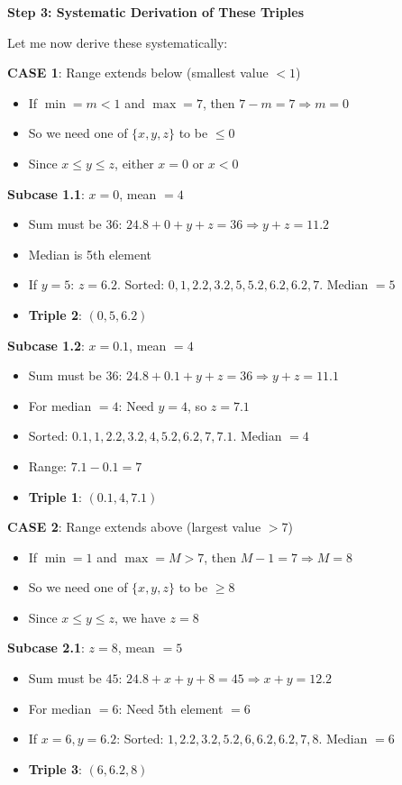 \documentclass[11pt]{article}
\begin{document}
\begin{solutionbox}
\textbf{Step 3: Systematic Derivation of These Triples}

Let me now derive these systematically:

\textbf{CASE 1}: Range extends below (smallest value $< 1$)
\begin{itemize}
    \item If $\min = m < 1$ and $\max = 7$, then $7 - m = 7 \Rightarrow m = 0$
    \item So we need one of $\{x, y, z\}$ to be $\leq 0$
    \item Since $x \leq y \leq z$, either $x = 0$ or $x < 0$
\end{itemize}

\textbf{Subcase 1.1}: $x = 0$, mean $= 4$
\begin{itemize}
    \item Sum must be $36$: $24.8 + 0 + y + z = 36 \Rightarrow y + z = 11.2$
    \item Median is 5th element
    \item If $y = 5$: $z = 6.2$. Sorted: $0, 1, 2.2, 3.2, 5, 5.2, 6.2, 6.2, 7$. Median $= 5$ \checkmark
    \item \textbf{Triple 2}: $(0, 5, 6.2)$ \checkmark
\end{itemize}

\textbf{Subcase 1.2}: $x = 0.1$, mean $= 4$
\begin{itemize}
    \item Sum must be $36$: $24.8 + 0.1 + y + z = 36 \Rightarrow y + z = 11.1$
    \item For median $= 4$: Need $y = 4$, so $z = 7.1$
    \item Sorted: $0.1, 1, 2.2, 3.2, 4, 5.2, 6.2, 7, 7.1$. Median $= 4$ \checkmark
    \item Range: $7.1 - 0.1 = 7$ \checkmark
    \item \textbf{Triple 1}: $(0.1, 4, 7.1)$ \checkmark
\end{itemize}

\textbf{CASE 2}: Range extends above (largest value $> 7$)
\begin{itemize}
    \item If $\min = 1$ and $\max = M > 7$, then $M - 1 = 7 \Rightarrow M = 8$
    \item So we need one of $\{x, y, z\}$ to be $\geq 8$
    \item Since $x \leq y \leq z$, we have $z = 8$
\end{itemize}

\textbf{Subcase 2.1}: $z = 8$, mean $= 5$
\begin{itemize}
    \item Sum must be $45$: $24.8 + x + y + 8 = 45 \Rightarrow x + y = 12.2$
    \item For median $= 6$: Need 5th element $= 6$
    \item If $x = 6, y = 6.2$: Sorted: $1, 2.2, 3.2, 5.2, 6, 6.2, 6.2, 7, 8$. Median $= 6$ \checkmark
    \item \textbf{Triple 3}: $(6, 6.2, 8)$ \checkmark
\end{itemize}


\end{solutionbox}
\end{document}
